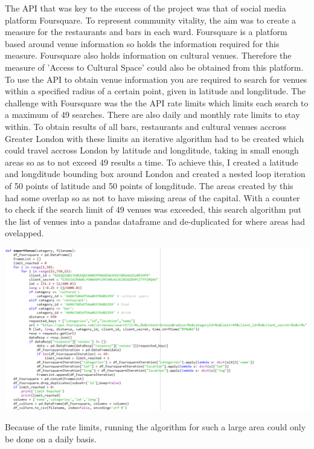 The API that was key to the success of the project was that of social media platform Foursquare. To represent community vitality, the aim was to create a measure for the restaurants and bars in each ward. Foursquare is a platform based around venue information so holds the information required for this measure. Foursquare also holds information on cultural venues. Therefore the measure of 'Access to Cultural Space' could also be obtained from this platform.
To use the API to obtain venue information you are required to search for venues within a specified radius of a certain point, given in latitude and longditude. The challenge with Foursquare was the the API rate limits which limits each search to a maximum of 49 searches. There are also daily and monthly rate limits to stay within.
To obtain results of all bars, restaurants and cultural venues accross Greater London with these limits an iterative algorithm had to be created which could travel accross London by latitude and longditude, taking in small enough areas so as to not exceed 49 results a time. To achieve this, I created a latitude and longditude bounding box around London and created a nested loop iteration of 50 points of latitude and 50 points of longditude. The areas created by this had some overlap so as not to have missing areas of the capital. With a counter to check if the search limit of 49 venues was exceeded, this search algorithm put the list of venues into a pandas dataframe and de-duplicated for where areas had ovelapped.

\includegraphics[scale=0.75]{figures/API_import} %

Because of the rate limits, running the algorithm for such a large area could only be done on a daily basis.


